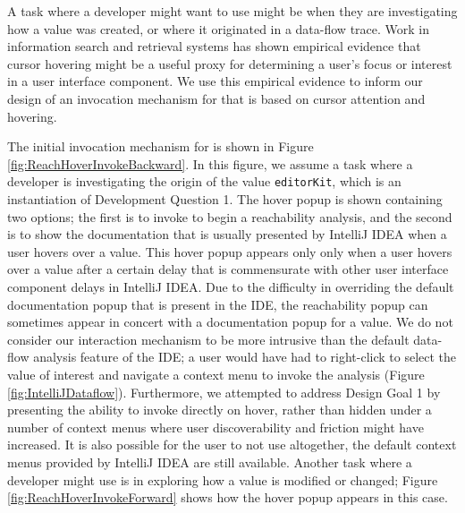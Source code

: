 \noindent A task where a developer might want to use \toolname{} might be when 
they are investigating how a value was created, or where it originated in a 
data-flow trace. 
Work in information search and retrieval systems
\cite{huang-2012-mouse,guo-2010-hover} has shown empirical evidence that cursor
hovering might be a useful proxy for determining a user's focus or interest in
a user interface component.
We use this empirical evidence to inform our design of an invocation mechanism 
for \toolname{} that is based on cursor attention and hovering.

\par The initial invocation mechanism for \toolname{} is shown in Figure 
\ref{fig:ReachHoverInvokeBackward}.
In this figure, we assume a task where a developer is investigating the origin
of the value \texttt{editorKit}, which is an instantiation of 
Development Question 1.
The hover popup is shown containing two options; the first is to invoke
\toolname{} to begin a reachability analysis, and the second is to show the
documentation that is usually presented by IntelliJ IDEA when a user hovers
over a value.
This hover popup appears only only when a user hovers over a value after a 
certain delay that is commensurate with other user interface component delays 
in IntelliJ IDEA.
Due to the difficulty in overriding the default documentation popup that is
present in the \ac{IDE}, the reachability popup can sometimes appear in concert
with a documentation popup for a value.
We do not consider our interaction mechanism to be more intrusive than the
default data-flow analysis feature of the \ac{IDE};
a user would have had to right-click to select the value of interest and
navigate a context menu to invoke the analysis (Figure
\ref{fig:IntelliJDataflow}).
Furthermore, we attempted to address Design Goal 1 by presenting the ability to 
invoke \toolname{} directly on hover, rather than hidden under a number of 
context menus where user discoverability and friction might have increased.
It is also possible for the user to not use \toolname{} altogether, the default
context menus provided by IntelliJ IDEA are still available.
Another task where a developer might use \toolname{} is in exploring how a value
is modified or changed; Figure \ref{fig:ReachHoverInvokeForward} shows how
the hover popup appears in this case.

